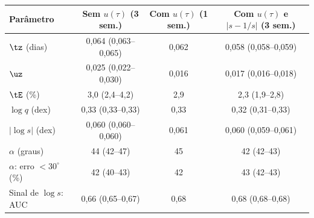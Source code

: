 \begin{tabular}{lccc}
	\toprule
	Parâmetro & Sem $u(\tau)$ (3 sem.) & Com $u(\tau)$ (1 sem.) & Com $u(\tau)$ e $|s - 1/s|$ (3 sem.) \\
	\midrule
	$\tz$ (dias) & 0{,}064 (0{,}063--0{,}065) & 0{,}062 & 0{,}058 (0{,}058--0{,}059) \\
	$\uz$ & 0{,}025 (0{,}022--0{,}030) & 0{,}016 & 0{,}017 (0{,}016--0{,}018) \\
	$\tE$ (\%) & 3{,}0 (2{,}4--4{,}2) & 2{,}9 & 2{,}3 (1{,}9--2{,}8) \\
	$\log q$ (dex) & 0{,}33 (0{,}33--0{,}33) & 0{,}33 & 0{,}32 (0{,}31--0{,}33) \\
	$|\log s|$ (dex) & 0{,}060 (0{,}060--0{,}060) & 0{,}061 & 0{,}060 (0{,}059--0{,}061) \\
	$\alpha$ (graus) & 44 (42--47) & 45 & 42 (42--43) \\
	$\alpha$: erro $< 30^\circ$ (\%) & 42 (40--43) & 42 & 43 (42--43) \\
	Sinal de $\log s$: AUC & 0{,}66 (0{,}65--0{,}67) & 0{,}68 & 0{,}68 (0{,}68--0{,}68) \\
	\bottomrule
\end{tabular}
